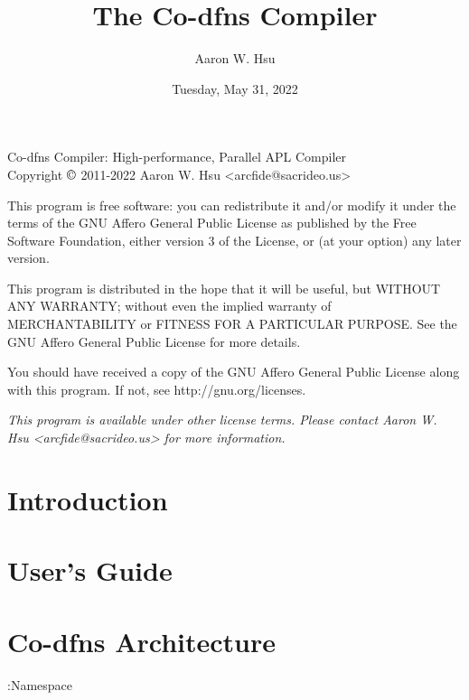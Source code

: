 \documentclass{article}%
\begin{document}
\nwdocspar
\title{The Co-dfns Compiler}
\author{Aaron W. Hsu}
\date{Tuesday, May 31, 2022}

\maketitle

\vfill

\noindent
Co-dfns Compiler: High-performance, Parallel APL Compiler\\
Copyright $\copyright$ 2011-2022 Aaron W. Hsu <arcfide@sacrideo.us>
\medskip

\noindent
This program is free software: you can redistribute it and/or modify
it under the terms of the GNU Affero General Public License as published by
the Free Software Foundation, either version 3 of the License, or
(at your option) any later version.
\medskip

\noindent
This program is distributed in the hope that it will be useful,
but WITHOUT ANY WARRANTY; without even the implied warranty of
MERCHANTABILITY or FITNESS FOR A PARTICULAR PURPOSE.  See the
GNU Affero General Public License for more details.\medskip

\noindent
You should have received a copy of the GNU Affero General Public License
along with this program.
If not, see http://gnu.org/licenses.
\medskip

\noindent
\emph{This program is available under other license terms. Please contact
Aaron W. Hsu <arcfide@sacrideo.us> for more information.}


\clearpage

\tableofcontents

\clearpage

\section{Introduction}

\section{User's Guide}

\section{Co-dfns Architecture}

\nwenddocs{}\endmoddef\nwstartdeflinemarkup\nwenddeflinemarkup
:Namespace 
\end{document}
